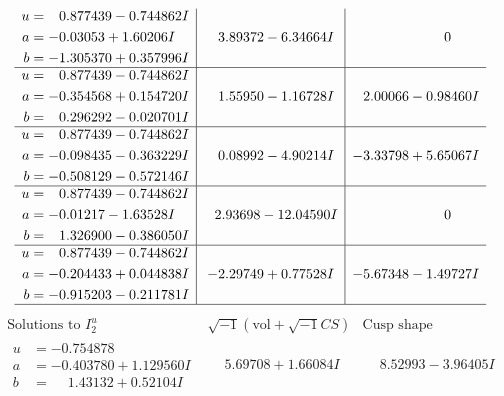 \documentclass[1p]{elsarticle_modified}
\theoremstyle{definition}
\newcommand{\I}{\sqrt{-1}}
\begin{document}
$$\begin{array}{c|c|c}
\begin{aligned}
u &= \phantom{-}0.877439 - 0.744862 I \\
a &= -0.03053 + 1.60206 I \\
b &= -1.305370 + 0.357996 I\end{aligned}
 & \phantom{-}3.89372 - 6.34664 I & \phantom{-0.000000 } 0 \\ \hline\begin{aligned}
u &= \phantom{-}0.877439 - 0.744862 I \\
a &= -0.354568 + 0.154720 I \\
b &= \phantom{-}0.296292 - 0.020701 I\end{aligned}
 & \phantom{-}1.55950 - 1.16728 I & \phantom{-}2.00066 - 0.98460 I \\ \hline\begin{aligned}
u &= \phantom{-}0.877439 - 0.744862 I \\
a &= -0.098435 - 0.363229 I \\
b &= -0.508129 - 0.572146 I\end{aligned}
 & \phantom{-}0.08992 - 4.90214 I & -3.33798 + 5.65067 I \\ \hline\begin{aligned}
u &= \phantom{-}0.877439 - 0.744862 I \\
a &= -0.01217 - 1.63528 I \\
b &= \phantom{-}1.326900 - 0.386050 I\end{aligned}
 & \phantom{-}2.93698 - 12.04590 I & \phantom{-0.000000 } 0 \\ \hline\begin{aligned}
u &= \phantom{-}0.877439 - 0.744862 I \\
a &= -0.204433 + 0.044838 I \\
b &= -0.915203 - 0.211781 I\end{aligned}
 & -2.29749 + 0.77528 I & -5.67348 - 1.49727 I\\
 \hline 
 \end{array}$$\newpage$$\begin{array}{c|c|c}  
\text{Solutions to }I^u_{2}& \I (\text{vol} + \sqrt{-1}CS) & \text{Cusp shape}\\
 \hline 
\begin{aligned}
u &= -0.754878\phantom{ +0.000000I} \\
a &= -0.403780 + 1.129560 I \\
b &= \phantom{-}1.43132 + 0.52104 I\end{aligned}
 & \phantom{-}5.69708 + 1.66084 I & \phantom{-}8.52993 - 3.96405 I \\ \hline\begin{aligned}

\end{aligned}
\end{array}$$
\end{document}
